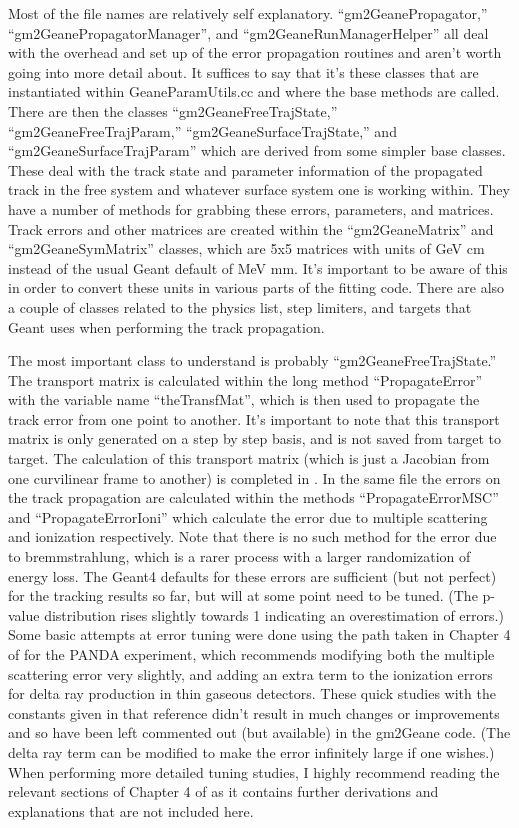 	Most of the file names are relatively self explanatory. ``gm2GeanePropagator,'' ``gm2GeanePropagatorManager'', and ``gm2GeaneRunManagerHelper'' all deal with the overhead and set up of the error propagation routines and aren't worth going into more detail about. It suffices to say that it's these classes that are instantiated within GeaneParamUtils.cc and where the base methods are called. There are then the classes ``gm2GeaneFreeTrajState,'' ``gm2GeaneFreeTrajParam,'' ``gm2GeaneSurfaceTrajState,'' and ``gm2GeaneSurfaceTrajParam'' which are derived from some simpler base classes. These deal with the track state and parameter information of the propagated track in the free system and whatever surface system one is working within. They have a number of methods for grabbing these errors, parameters, and matrices. Track errors and other matrices are created within the ``gm2GeaneMatrix'' and ``gm2GeaneSymMatrix'' classes, which are 5x5 matrices with units of GeV cm instead of the usual Geant default of MeV mm. It's important to be aware of this in order to convert these units in various parts of the fitting code. There are also a couple of classes related to the physics list, step limiters, and targets that Geant uses when performing the track propagation. 

	The most important class to understand is probably ``gm2GeaneFreeTrajState.'' The transport matrix is calculated within the long method ``PropagateError'' with the variable name ``theTransfMat'', which is then used to propagate the track error from one point to another. It's important to note that this transport matrix is only generated on a step by step basis, and is not saved from target to target. The calculation of this transport matrix (which is just a Jacobian from one curvilinear frame to another) is completed in \cite{jacob}. In the same file the errors on the track propagation are calculated within the methods ``PropagateErrorMSC'' and ``PropagateErrorIoni'' which calculate the error due to multiple scattering and ionization respectively. Note that there is no such method for the error due to bremmstrahlung, which is a rarer process with a larger randomization of energy loss. The Geant4 defaults for these errors are sufficient (but not perfect) for the tracking results so far, but will at some point need to be tuned. (The p-value distribution rises slightly towards 1 indicating an overestimation of errors.) Some basic attempts at error tuning were done using the path taken in Chapter 4 of \cite{Lavezzi} for the PANDA experiment, which recommends modifying both the multiple scattering error very slightly, and adding an extra term to the ionization errors for delta ray production in thin gaseous detectors. These quick studies with the constants given in that reference didn't result in much changes or improvements and so have been left commented out (but available) in the gm2Geane code. (The delta ray term can be modified to make the error infinitely large if one wishes.) When performing more detailed tuning studies, I highly recommend reading the relevant sections of Chapter 4 of \cite{Lavezzi} as it contains further derivations and explanations that are not included here.

